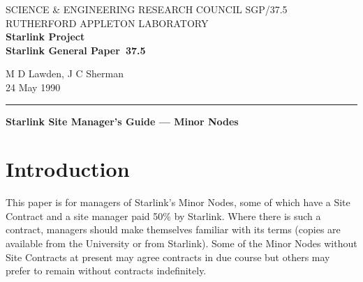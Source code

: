 \pagestyle{myheadings}

\newcommand{\stardoccategory}  {Starlink General Paper}
\newcommand{\stardocinitials}  {SGP}
\newcommand{\stardocnumber}    {37.5}
\newcommand{\stardocauthors}   {M D Lawden, J C Sherman}
\newcommand{\stardocdate}      {24 May 1990}
\newcommand{\stardoctitle}     {Starlink Site Manager's Guide --- Minor Nodes}

\newcommand{\stardocname}{\stardocinitials /\stardocnumber}
\markright{\stardocname}
\setlength{\textwidth}{160mm}
\setlength{\textheight}{240mm}
\setlength{\topmargin}{-5mm}
\setlength{\oddsidemargin}{0mm}
\setlength{\evensidemargin}{0mm}
\setlength{\parindent}{0mm}
\setlength{\parskip}{\medskipamount}
\setlength{\unitlength}{1mm}


\thispagestyle{empty}
SCIENCE \& ENGINEERING RESEARCH COUNCIL \hfill \stardocname\\
RUTHERFORD APPLETON LABORATORY\\
{\large\bf Starlink Project\\}
{\large\bf \stardoccategory\ \stardocnumber}
\begin{flushright}
\stardocauthors\\
\stardocdate
\end{flushright}
\vspace{-4mm}
\rule{\textwidth}{0.5mm}
\vspace{5mm}
\begin{center}
{\Large\bf \stardoctitle}
\end{center}
\vspace{5mm}

\setlength{\parskip}{0mm}
\tableofcontents
\setlength{\parskip}{\medskipamount}
\markright{\stardocname}

\newpage

\section {Introduction}

This paper is for managers of Starlink's Minor Nodes, some of which have a
Site Contract and a site manager paid 50\% by Starlink.
Where there is such a contract, managers should make themselves familiar with
its terms (copies are available from the University or from Starlink).
Some of the Minor Nodes without Site Contracts at present may agree contracts
in due course but others may prefer to remain without contracts indefinitely.
 
